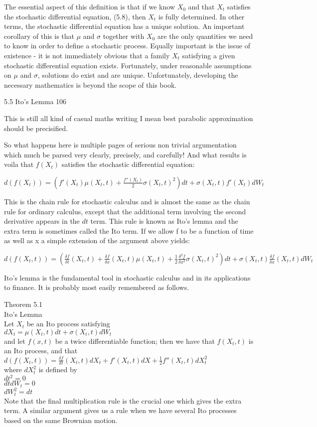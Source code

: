 The essential aspect of this definition is that if we know $X_0$ and that $X_t$ satisfies the stochastic differential equation, (5.8), then $X_t$ is fully determined. In other terms, the stochastic differential equation has a unique solution. An important corollary of this is that $\mu$ and $\sigma$ together with $X_0$ are the only quantities we need to know in order to define a stochastic process. Equally important is the issue of existence - it is not immediately obvious that a family $X_t$ satisfying a given stochastic differential equation exists. Fortunately, under reasonable assumptions on $\mu$ and $\sigma$, solutions do exist and are unique. Unfortunately, developing the necessary mathematics is beyond the scope of this book.

5.5 Ito's Lemma 106

This is still all kind of casual maths writing I mean best parabolic approximation should be precisified.

So what happens here is multiple pages of serious non trivial argumentation which much be parsed very clearly, precisely, and carefully! And what results is voila that $f(X_t)$ satisfies the stochastic differential equation:

$d(f(X_t)) = \left( f'(X_t) \mu (X_t,t) + \frac{f''(X_t)}{2} \sigma (X_t,t)^2 \right) dt + \sigma (X_t,t) f'(X_t) dW_t$

This is the chain rule for stochastic calculus and is almost the same as the chain rule for ordinary calculus, except that the additional term involving the second derivative appears in the $dt$ term. This rule is known as Ito's lemma and the extra term is sometimes called the Ito term. If we allow f to be a function of time as well as x a simple extension of the argument above yields:

$d(f(X_t,t)) = \left( \frac{\delta f}{\delta t}(X_t,t) + \frac{\delta f}{\delta x} (X_t,t) \mu (X_t,t) + \frac{1}{2} \frac{\delta^2 f}{\delta x^2} \sigma (X_t,t)^2 \right) dt + \sigma (X_t,t) \frac{\delta f}{\delta x}(X_t,t) dW_t$

Ito's lemma is the fundamental tool in stochastic calculus and in its applications to finance. It is probably most easily remembered as follows.

Theorem 5.1 \\
Ito's Lemma \\
Let $X_t$ be an Ito process satisfying \\
$dX_t = \mu (X_t,t) dt + \sigma (X_t,t) dW_t$ \\
and let $f(x,t)$ be a twice differentiable function; then we have that $f(X_t,t)$ is an Ito process, and that \\
$d(f(X_t,t)) = \frac{\delta f}{\delta t}(X_t,t) dX_t + f'(X_t,t) dX + \frac{1}{2} f'' (X_t,t) dX_t^2$ \\
where $dX_t^2$ is defined by \\
$dt^2 = 0$ \\
$dt dW_t = 0$ \\
$dW_t^2 = dt$ \\
Note that the final multiplication rule is the crucial one which gives the extra term. A similar argument gives us a rule when we have several Ito processes based on the same Brownian motion.


